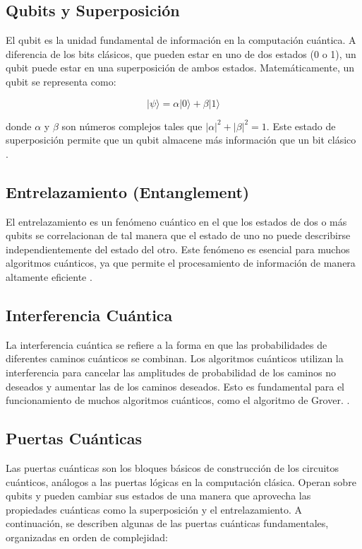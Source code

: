 \documentclass[11pt,a4paper,spanish]{book}
\begin{document}
\subsection{Qubits y Superposición}

El qubit es la unidad fundamental de información en la computación cuántica. A diferencia de los bits clásicos, que pueden estar en uno de dos estados (0 o 1), un qubit puede estar en una superposición de ambos estados. Matemáticamente, un qubit se representa como:

\[ \lvert \psi \rangle = \alpha \lvert 0 \rangle + \beta \lvert 1 \rangle \]

donde \(\alpha\) y \(\beta\) son números complejos tales que \(|\alpha|^2 + |\beta|^2 = 1\). Este estado de superposición permite que un qubit almacene más información que un bit clásico \cite{nielsenChuang}.

\subsection{Entrelazamiento (Entanglement)}

El entrelazamiento es un fenómeno cuántico en el que los estados de dos o más qubits se correlacionan de tal manera que el estado de uno no puede describirse independientemente del estado del otro. Este fenómeno es esencial para muchos algoritmos cuánticos, ya que permite el procesamiento de información de manera altamente eficiente \cite{nielsenChuang}.

\subsection{Interferencia Cuántica}

La interferencia cuántica se refiere a la forma en que las probabilidades de diferentes caminos cuánticos se combinan. Los algoritmos cuánticos utilizan la interferencia para cancelar las amplitudes de probabilidad de los caminos no deseados y aumentar las de los caminos deseados. Esto es fundamental para el funcionamiento de muchos algoritmos cuánticos, como el algoritmo de Grover. \cite{groverAlgorithm}.

\subsection{Puertas Cuánticas}

Las puertas cuánticas son los bloques básicos de construcción de los circuitos cuánticos, análogos a las puertas lógicas en la computación clásica. Operan sobre qubits y pueden cambiar sus estados de una manera que aprovecha las propiedades cuánticas como la superposición y el entrelazamiento. A continuación, se describen algunas de las puertas cuánticas fundamentales, organizadas en orden de complejidad:
\end{document}
